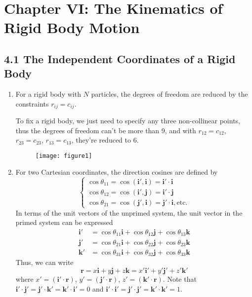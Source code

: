 \documentclass{article}
\begin{document}
	
	\section*{Chapter VI: The Kinematics of Rigid Body Motion}
	
	\subsection*{4.1 The Independent Coordinates of a Rigid Body}
	\begin{enumerate}
		\item For a rigid body with $N$ particles, the degrees of freedom are reduced by the constraints $r_{ij} = c_{ij}$.
		
		To fix a rigid body, we just need to specify any three non-collinear points, thus the degrees of freedom can't be more than 9, and with $r_{12} = c_{12}$, $r_{23} = c_{23}$, $r_{13} = c_{13}$, they're reduced to 6. 
		
        \begin{figure}[h]
        	\centering
         	\texttt{[image: figure1]}
	        \caption{}
        	\label{fig:figure1}
        \end{figure}
        
		\item For two Cartesian coordinates, the direction cosines are defined by
		\[
		\begin{cases}
			\cos\theta_{11} = \cos(\mathbf{i'}, \mathbf{i}) = \mathbf{i'} \cdot \mathbf{i} \\
			\cos\theta_{12} = \cos(\mathbf{i'}, \mathbf{j}) = \mathbf{i'} \cdot \mathbf{j} \\
			\cos\theta_{21} = \cos(\mathbf{j'}, \mathbf{i}) = \mathbf{j'} \cdot \mathbf{i}, \text{etc.}
		\end{cases}
		\]
		In terms of the unit vectors of the unprimed system, the unit vector in the primed system can be expressed
		\begin{align*}
			\mathbf{i'} &= \cos\theta_{11}\mathbf{i} + \cos\theta_{12}\mathbf{j} + \cos\theta_{13}\mathbf{k} \\
			\mathbf{j'} &= \cos\theta_{21}\mathbf{i} + \cos\theta_{22}\mathbf{j} + \cos\theta_{23}\mathbf{k} \\
			\mathbf{k'} &= \cos\theta_{31}\mathbf{i} + \cos\theta_{32}\mathbf{j} + \cos\theta_{33}\mathbf{k}
		\end{align*}
		Thus, we can write
		\[
		\mathbf{r} = x\mathbf{i} + y\mathbf{j} + z\mathbf{k} = x'\mathbf{i'} + y'\mathbf{j'} + z'\mathbf{k'}
		\]
		where $x' = (\mathbf{i'} \cdot \mathbf{r})$, $y' = (\mathbf{j'} \cdot \mathbf{r})$, $z' = (\mathbf{k'} \cdot \mathbf{r})$. Note that $\mathbf{i'} \cdot \mathbf{j'} = \mathbf{j'} \cdot \mathbf{k'} = \mathbf{k'} \cdot \mathbf{i'} = 0$ and $\mathbf{i'} \cdot \mathbf{i'} = \mathbf{j'} \cdot \mathbf{j'} = \mathbf{k'} \cdot \mathbf{k'} = 1$.
	

\end{enumerate}
\end{document}
